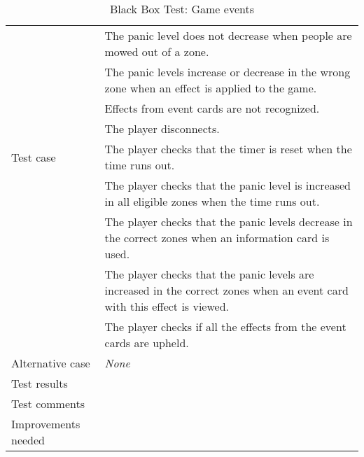 {\begin{table}[H]
\begin{tabular}{| p{5cm} | p{10cm} |}
		& The panic level does not decrease when people are mowed out of a zone.\\
		& The panic levels increase or decrease in the wrong zone when an effect is applied to the game.\\
		& Effects from event cards are not recognized.\\
		& The player disconnects.\\ \hline
	Test case
		& The player checks that the timer is reset when the time runs out.\\
		& The player checks that the panic level is increased in all eligible zones when the time runs out.\\
		& The player checks that the panic levels decrease in the correct zones when an information card is used.\\
		& The player checks that the panic levels are increased in the correct zones when an event card with this effect is viewed. \\
		& The player checks if all the effects from the event cards are upheld. \\ \hline
	Alternative case
		& \emph{None}\\ \hline
	Test results 
		& \\ \hline
	Test comments
		& \\ \hline
	Improvements needed
		& \\ \hline
\end{tabular}


\caption{Black Box Test: Game events}
\label{fig:black_box_test_6}
\end{table}}


